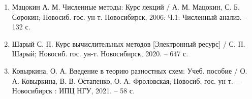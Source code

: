 \documentclass[../main.tex]{subfile}
\begin{document}
\begin{enumerate}[nosep]
	\item Мацокин А. М. Численные методы: Курс лекций / А. М. Мацокин,
		С. Б. Сорокин; Новосиб. гос. ун-т. Новосибирск, 2006: Ч.1:
		Численный анализ. -- 132 с.
	\item Шарый С. П. Курс вычислительных методов [Электронный ресурс] /
		С. П. Шарый; Новосиб. гос. ун-т. Новосибирск, 2020. -- 647 с.
	\item Ковыркина, О. А. Введение в теорию разностных схем: Учеб. пособие
		/ О. А. Ковыркина, В. В. Остапенко, О. А. Фроловская; Новосиб.
		гос. ун-т. --- Новосибирск : ИПЦ НГУ, 2021. -- 58 с.
\end{enumerate}
\end{document}
